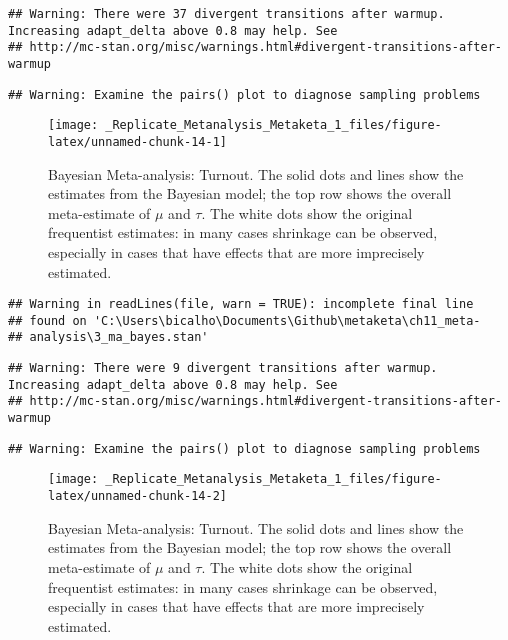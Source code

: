 \documentclass[]{article}
\begin{document}
\begin{verbatim}
## Warning: There were 37 divergent transitions after warmup. Increasing adapt_delta above 0.8 may help. See
## http://mc-stan.org/misc/warnings.html#divergent-transitions-after-warmup
\end{verbatim}

\begin{verbatim}
## Warning: Examine the pairs() plot to diagnose sampling problems
\end{verbatim}

\begin{figure}

{\centering \texttt{[image: \_Replicate\_Metanalysis\_Metaketa\_1\_files/figure-latex/unnamed-chunk-14-1]} 

}

\caption{Bayesian Meta-analysis: Turnout. The solid dots and lines show the estimates from the Bayesian model; the top row shows the overall meta-estimate of $\mu$ and $\tau$. The white dots show the original frequentist estimates: in many cases shrinkage can be observed, especially in cases that have effects that are more imprecisely estimated.}\label{fig:unnamed-chunk-141}
\end{figure}

\begin{verbatim}
## Warning in readLines(file, warn = TRUE): incomplete final line
## found on 'C:\Users\bicalho\Documents\Github\metaketa\ch11_meta-
## analysis\3_ma_bayes.stan'
\end{verbatim}

\begin{verbatim}
## Warning: There were 9 divergent transitions after warmup. Increasing adapt_delta above 0.8 may help. See
## http://mc-stan.org/misc/warnings.html#divergent-transitions-after-warmup
\end{verbatim}

\begin{verbatim}
## Warning: Examine the pairs() plot to diagnose sampling problems
\end{verbatim}

\begin{figure}

{\centering \texttt{[image: \_Replicate\_Metanalysis\_Metaketa\_1\_files/figure-latex/unnamed-chunk-14-2]} 

}

\caption{Bayesian Meta-analysis: Turnout. The solid dots and lines show the estimates from the Bayesian model; the top row shows the overall meta-estimate of $\mu$ and $\tau$. The white dots show the original frequentist estimates: in many cases shrinkage can be observed, especially in cases that have effects that are more imprecisely estimated.}\label{fig:unnamed-chunk-142}
\end{figure}
\end{document}
